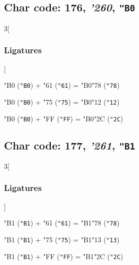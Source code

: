 \documentclass{article}
\newlength{\maxcharwidth}
\begin{document}
\subsection{Char code: 176, {\it'260}, {\tt"B0}}
\label{char_176}


\begin{multicols}{3}[\subsubsection{Ligatures}]

{\testfont\char"B0\noboundary} ({\tt"B0}) + {\testfont\char"61\noboundary} ({\tt"61}) = {\testfont\char"B0\noboundary}{\testfont\char"78\noboundary} ({\tt"78}) 

{\testfont\char"B0\noboundary} ({\tt"B0}) + {\testfont\char"75\noboundary} ({\tt"75}) = {\testfont\char"B0\noboundary}{\testfont\char"12\noboundary} ({\tt"12}) 

{\testfont\char"B0\noboundary} ({\tt"B0}) + {\testfont\char"FF\noboundary} ({\tt"FF}) = {\testfont\char"B0\noboundary}{\testfont\char"2C\noboundary} ({\tt"2C}) 

\end{multicols}

\subsection{Char code: 177, {\it'261}, {\tt"B1}}
\label{char_177}


\begin{multicols}{3}[\subsubsection{Ligatures}]

{\testfont\char"B1\noboundary} ({\tt"B1}) + {\testfont\char"61\noboundary} ({\tt"61}) = {\testfont\char"B1\noboundary}{\testfont\char"78\noboundary} ({\tt"78}) 

{\testfont\char"B1\noboundary} ({\tt"B1}) + {\testfont\char"75\noboundary} ({\tt"75}) = {\testfont\char"B1\noboundary}{\testfont\char"13\noboundary} ({\tt"13}) 

{\testfont\char"B1\noboundary} ({\tt"B1}) + {\testfont\char"FF\noboundary} ({\tt"FF}) = {\testfont\char"B1\noboundary}{\testfont\char"2C\noboundary} ({\tt"2C}) 

\end{multicols}
\end{document}
